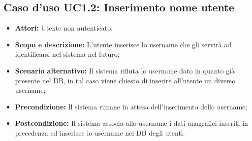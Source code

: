 \documentclass[12pt,a4paper,titlepage]{article}
\begin{document}
	\subsection{Caso d'uso UC1.2: Inserimento nome utente}
	\label{UC1.2}
	\begin{itemize}
		\item \textbf{Attori: }Utente non autenticato;
		\item \textbf{Scopo e descrizione: }L'utente inserisce lo username che gli servirà ad identificarsi nel sistema nel futuro;
		\item \textbf{Scenario alternativo: }Il sistema rifiuta lo username dato in quanto già presente nel DB, in tal caso viene chiesto di inserire all'utente un diverso username;
		\item \textbf{Precondizione: }Il sistema rimane in attesa dell'inserimento dello username;
		\item \textbf{Postcondizione: }Il sistema associa allo username i dati anagrafici inseriti in precedenza ed inserisce lo username nel DB degli utenti.
	\end{itemize}
\end{document}
